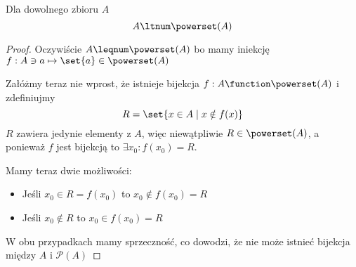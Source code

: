 \begin{theorem}[Cantor]
	Dla dowolnego zbioru \( A \)
	\[
		A \ltnum \powerset(A)
	\]
\end{theorem}
\begin{proof}
	Oczywiście \( A \leqnum \powerset(A) \) bo mamy iniekcję \( f: A \ni a \mapsto \set{a} \in \powerset(A) \)

	Załóżmy teraz nie wprost, że istnieje bijekcja \( f: A \function \powerset(A) \) i zdefiniujmy
	\[
		R = \set{ x \in A \mid x \notin f(x) }
	\]
	\( R \) zawiera jedynie elementy z \( A \), więc niewątpliwie \( R \in \powerset(A) \), a ponieważ \( f \) jest bijekcją to \( \exists x_0 : f(x_0) = R \).

	Mamy teraz dwie możliwości:
	\begin{itemize}
		\item Jeśli \( x_0 \in R = f(x_0) \) to \( x_0 \notin f(x_0) = R \)
		\item Jeśli \( x_0 \notin R \) to \( x_0 \in f(x_0) = R \)
	\end{itemize}
	W obu przypadkach mamy sprzeczność, co dowodzi, że nie może istnieć bijekcja między \( A \) i \( \mathcal{P}(A) \)
\end{proof}